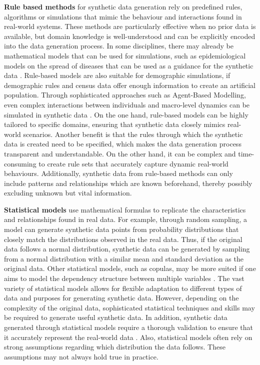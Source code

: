 \textbf{Rule based methods} for synthetic data generation rely on predefined rules, algorithms or simulations that mimic the behaviour and interactions found in real-world systems. These methods are particularly effective when no prior data is available, but domain knowledge is well-understood and can be explicitly encoded into the data generation process. In some disciplines, there may already be mathematical models that can be used for simulations, such as epidemiological models on the spread of diseases that can be used as a guidance for the synthetic data \cite{ajelli2018rapidd,gonzales2023synthetic}. Rule-based models are also suitable for demographic simulations, if demographic rules and census data offer enough information to create an artificial population. Through sophisticated approaches such as Agent-Based Modelling, even complex interactions between individuals and macro-level dynamics can be simulated in synthetic data \cite{grinberger2017dynamic}. On the one hand, rule-based models can be highly tailored to specific domains, ensuring that synthetic data closely mimics real-world scenarios. Another benefit is that the rules through which the synthetic data is created need to be specified, which makes the data generation process transparent and understandable. On the other hand, it can be complex and time-consuming to create rule sets that accurately capture dynamic real-world behaviours. Additionally, synthetic data from rule-based methods can only include patterns and relationships which are known beforehand, thereby possibly excluding unknown but vital information. 

\textbf{Statistical models} use mathematical formulas to replicate the characteristics and relationships found in real data. For example, through random sampling, a model can generate synthetic data points from probability distributions that closely match the distributions observed in the real data. Thus, if the original data follows a normal distribution, synthetic data can be generated by sampling from a normal distribution with a similar mean and standard deviation as the original data. Other statistical models, such as copulas, may be more suited if one aims to model the dependency structure between multiple variables \cite{kamthe2021copula}. The vast variety of statistical models allows for flexible adaptation to different types of data and purposes for generating synthetic data. However, depending on the complexity of the original data, sophisticated statistical techniques and skills may be required to generate useful synthetic data. In addition, synthetic data generated through statistical models require a thorough validation to ensure that it accurately represent the real-world data \cite{pezoulas2024synthetic}. Also, statistical models often rely on strong assumptions regarding which distribution the data follows. These assumptions may not always hold true in practice. 

